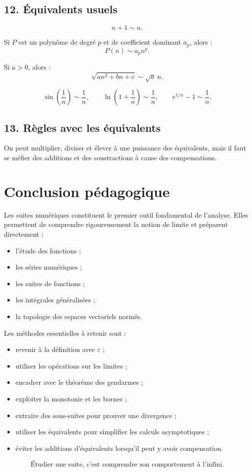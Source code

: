 \documentclass[11pt,a4paper]{article}
\begin{document}
\subsection*{12. Équivalents usuels}

\[
n+1\sim n.
\]

Si \(P\) est un polynôme de degré \(p\) et de coefficient dominant \(a_p\), alors :
\[
P(n)\sim a_p n^p.
\]

Si \(a>0\), alors :
\[
\sqrt{a n^2+bn+c}\sim \sqrt a\,n.
\]

\[
\sin\left(\frac1n\right)\sim\frac1n,
\qquad
\ln\left(1+\frac1n\right)\sim\frac1n,
\qquad
e^{1/n}-1\sim\frac1n.
\]

\subsection*{13. Règles avec les équivalents}

On peut multiplier, diviser et élever à une puissance des équivalents, mais il faut se méfier des additions et des soustractions à cause des compensations.

\section*{Conclusion pédagogique}

Les suites numériques constituent le premier outil fondamental de l'analyse. Elles permettent de comprendre rigoureusement la notion de limite et préparent directement :
\begin{itemize}
    \item l'étude des fonctions ;
    \item les séries numériques ;
    \item les suites de fonctions ;
    \item les intégrales généralisées ;
    \item la topologie des espaces vectoriels normés.
\end{itemize}

Les méthodes essentielles à retenir sont :
\begin{itemize}
    \item revenir à la définition avec \(\varepsilon\) ;
    \item utiliser les opérations sur les limites ;
    \item encadrer avec le théorème des gendarmes ;
    \item exploiter la monotonie et les bornes ;
    \item extraire des sous-suites pour prouver une divergence ;
    \item utiliser les équivalents pour simplifier les calculs asymptotiques ;
    \item éviter les additions d'équivalents lorsqu'il peut y avoir compensation.
\end{itemize}

\begin{center}
\[
\boxed{
\text{Étudier une suite, c'est comprendre son comportement à l'infini.}
}
\]
\end{center}
\end{document}
